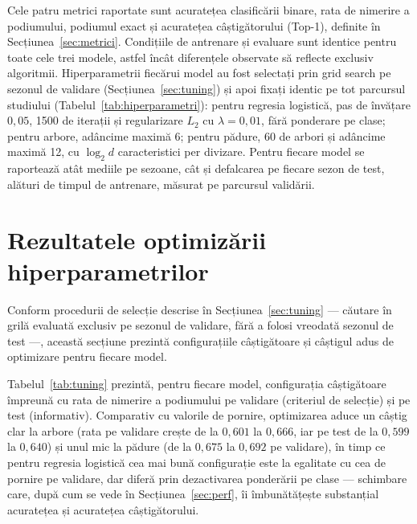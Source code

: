 \documentclass[12pt,a4paper]{report}
\begin{document}
Cele patru metrici raportate sunt acuratețea clasificării binare, rata de nimerire a podiumului,
podiumul exact și acuratețea câștigătorului (Top-1), definite în Secțiunea~\ref{sec:metrici}.
Condițiile de antrenare și evaluare sunt identice pentru toate cele trei modele, astfel încât
diferențele observate să reflecte exclusiv algoritmii. Hiperparametrii fiecărui model au fost
selectați prin grid search pe sezonul de validare (Secțiunea~\ref{sec:tuning}) și apoi fixați
identic pe tot parcursul studiului (Tabelul~\ref{tab:hiperparametri}): pentru regresia logistică,
pas de învățare $0{,}05$, 1500 de iterații și regularizare $L_2$ cu $\lambda = 0{,}01$, fără
ponderare pe clase; pentru arbore, adâncime maximă 6; pentru pădure, 60 de arbori și adâncime maximă
12, cu $\log_2 d$ caracteristici per divizare. Pentru fiecare model se raportează atât mediile pe
sezoane, cât și defalcarea pe fiecare sezon de test, alături de timpul de antrenare, măsurat pe
parcursul validării.

\section{Rezultatele optimizării hiperparametrilor}
\label{sec:tuning_rez}

Conform procedurii de selecție descrise în Secțiunea~\ref{sec:tuning} --- căutare în grilă evaluată
exclusiv pe sezonul de validare, fără a folosi vreodată sezonul de test ---, această secțiune
prezintă configurațiile câștigătoare și câștigul adus de optimizare pentru fiecare model.

Tabelul~\ref{tab:tuning} prezintă, pentru fiecare model, configurația câștigătoare împreună cu rata
de nimerire a podiumului pe validare (criteriul de selecție) și pe test (informativ). Comparativ cu
valorile de pornire, optimizarea aduce un câștig clar la arbore (rata pe validare crește de la
$0{,}601$ la $0{,}666$, iar pe test de la $0{,}599$ la $0{,}640$) și unul mic la pădure (de la
$0{,}675$ la $0{,}692$ pe validare), în timp ce pentru regresia logistică cea mai bună configurație
este la egalitate cu cea de pornire pe validare, dar diferă prin dezactivarea ponderării pe clase ---
schimbare care, după cum se vede în Secțiunea~\ref{sec:perf}, îi îmbunătățește substanțial acuratețea
și acuratețea câștigătorului.
\end{document}
